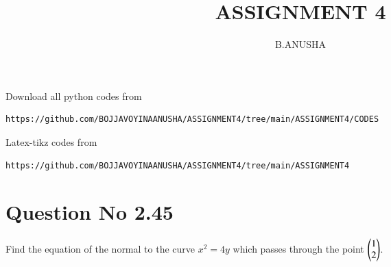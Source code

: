 \documentclass[journal,12pt,twocolumn]{IEEEtran}
\begin{document}
     \def\rightbox#1{\makebox[0in][r]{#1}}
     \def\centbox#1{\makebox[0in]{#1}}
     \def\topbox#1{\raisebox{-\baselineskip}[0in][0in]{#1}}
     \def\midbox#1{\raisebox{-0.5\baselineskip}[0in][0in]{#1}}
\vspace{3cm}
\title{ASSIGNMENT 4}
\author{B.ANUSHA}
\maketitle
\newpage
\bigskip
\renewcommand{\thefigure}{\theenumi}
\renewcommand{\thetable}{\theenumi}
Download all python codes from 
\begin{lstlisting}
https://github.com/BOJJAVOYINAANUSHA/ASSIGNMENT4/tree/main/ASSIGNMENT4/CODES
\end{lstlisting}
%
Latex-tikz codes from 
%
\begin{lstlisting}
https://github.com/BOJJAVOYINAANUSHA/ASSIGNMENT4/tree/main/ASSIGNMENT4
\end{lstlisting}
%
\section{Question No 2.45}
Find the equation of the normal to the curve $x^2 = 4y$ which passes through the point $\begin{pmatrix}1\\2\end{pmatrix}$.
\end{document}
